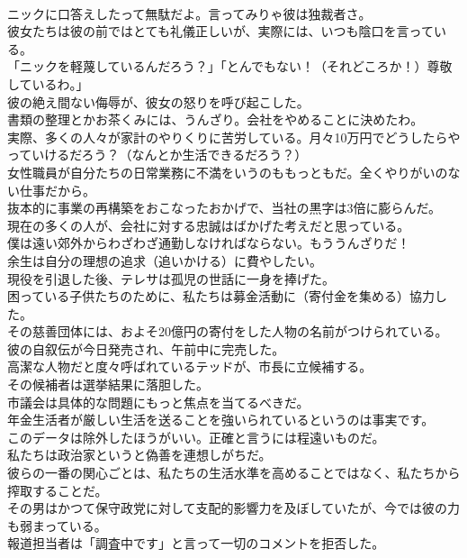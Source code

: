 \documentclass[8pt]{extreport}
\begin{document}
\begin{CJK}{UTF8}{min}
\\	ニックに口答えしたって無駄だよ。言ってみりゃ彼は独裁者さ。
\\	彼女たちは彼の前ではとても礼儀正しいが、実際には、いつも陰口を言っている。
\\	「ニックを軽蔑しているんだろう？」「とんでもない！（それどころか！）尊敬しているわ。」
\\	彼の絶え間ない侮辱が、彼女の怒りを呼び起こした。
\\	書類の整理とかお茶くみには、うんざり。会社をやめることに決めたわ。
\\	実際、多くの人々が家計のやりくりに苦労している。月々10万円でどうしたらやっていけるだろう？（なんとか生活できるだろう？）
\\	女性職員が自分たちの日常業務に不満をいうのももっともだ。全くやりがいのない仕事だから。
\\	抜本的に事業の再構築をおこなったおかげで、当社の黒字は3倍に膨らんだ。
\\	現在の多くの人が、会社に対する忠誠はばかげた考えだと思っている。
\\	僕は遠い郊外からわざわざ通勤しなければならない。もううんざりだ！
\\	余生は自分の理想の追求（追いかける）に費やしたい。
\\	現役を引退した後、テレサは孤児の世話に一身を捧げた。
\\	困っている子供たちのために、私たちは募金活動に（寄付金を集める）協力した。
\\	その慈善団体には、およそ20億円の寄付をした人物の名前がつけられている。
\\	彼の自叙伝が今日発売され、午前中に完売した。
\\	高潔な人物だと度々呼ばれているテッドが、市長に立候補する。
\\	その候補者は選挙結果に落胆した。
\\	市議会は具体的な問題にもっと焦点を当てるべきだ。
\\	年金生活者が厳しい生活を送ることを強いられているというのは事実です。
\\	このデータは除外したほうがいい。正確と言うには程遠いものだ。
\\	私たちは政治家というと偽善を連想しがちだ。
\\	彼らの一番の関心ごとは、私たちの生活水準を高めることではなく、私たちから搾取することだ。
\\	その男はかつて保守政党に対して支配的影響力を及ぼしていたが、今では彼の力も弱まっている。
\\	報道担当者は「調査中です」と言って一切のコメントを拒否した。

\end{CJK}
\end{document}
